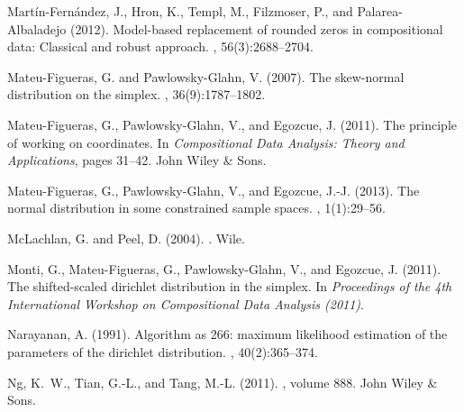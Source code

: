 \documentclass[10pt, a4paper]{article}
\begin{document}
\begin{thebibliography}{00}
Mart\'in-Fern\'andez, J., Hron, K., Templ, M., Filzmoser, P., and
  Palarea-Albaladejo (2012).
\newblock Model-based replacement of rounded zeros in compositional data:
  Classical and robust approach.
, 56(3):2688--2704.

Mateu-Figueras, G. and Pawlowsky-Glahn, V. (2007).
\newblock The skew-normal distribution on the simplex.
, 36(9):1787--1802.

Mateu-Figueras, G., Pawlowsky-Glahn, V., and Egozcue, J. (2011).
\newblock The principle of working on coordinates.
\newblock In {\em Compositional Data Analysis: Theory and Applications}, pages
  31--42. John Wiley \& Sons.

Mateu-Figueras, G., Pawlowsky-Glahn, V., and Egozcue, J.-J. (2013).
\newblock The normal distribution in some constrained sample spaces.
,
  1(1):29--56.

McLachlan, G. and Peel, D. (2004).
.
\newblock Wile.


Monti, G., Mateu-Figueras, G., Pawlowsky-Glahn, V., and Egozcue, J. (2011).
\newblock The shifted-scaled dirichlet distribution in the simplex.
\newblock In {\em Proceedings of the 4th International Workshop on
  Compositional Data Analysis (2011)}.

Narayanan, A. (1991).
\newblock Algorithm as 266: maximum likelihood estimation of the parameters of
  the dirichlet distribution.
, 40(2):365--374.

Ng, K.~W., Tian, G.-L., and Tang, M.-L. (2011).
, volume 888.
\newblock John Wiley \& Sons.


\end{thebibliography}
\end{document}
